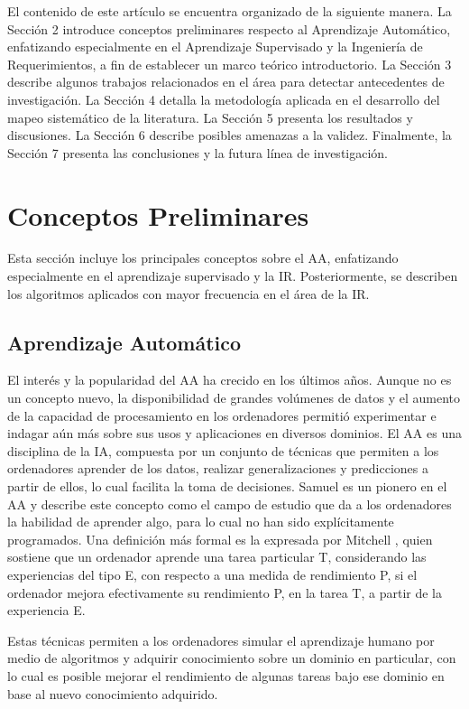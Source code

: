 \documentclass[journal]{IEEEtran}
\begin{document}
El contenido de este artículo se encuentra organizado de la siguiente manera. La Sección 2 introduce conceptos preliminares respecto al Aprendizaje Automático, enfatizando especialmente en el Aprendizaje Supervisado y la Ingeniería de Requerimientos, a fin de establecer un marco teórico introductorio. La Sección 3 describe algunos trabajos relacionados en el área para detectar antecedentes de investigación. La Sección 4 detalla la metodología aplicada en el desarrollo del mapeo sistemático de la literatura. La Sección 5 presenta los resultados y discusiones. La Sección 6 describe posibles amenazas a la validez. Finalmente, la Sección 7 presenta las conclusiones y la futura línea de investigación.  

\section{Conceptos Preliminares}

Esta sección incluye los principales conceptos sobre el AA, enfatizando especialmente en el aprendizaje supervisado y la IR. Posteriormente, se describen los algoritmos aplicados con mayor frecuencia en el área de la IR.

\subsection{Aprendizaje Automático}

El interés y la popularidad del AA ha crecido en los últimos años. Aunque no es un concepto nuevo, la disponibilidad de grandes volúmenes de datos y el aumento de la capacidad de procesamiento en los ordenadores permitió experimentar e indagar aún más sobre sus usos y aplicaciones en diversos dominios.
El AA es una disciplina de la IA, compuesta por un conjunto de técnicas que permiten a los ordenadores aprender de los datos, realizar generalizaciones y predicciones a partir de ellos, lo cual facilita la toma de decisiones. Samuel \cite{samuel1959some} es un pionero en el AA y describe este concepto como el campo de estudio que da a los ordenadores la habilidad de aprender algo, para lo cual no han sido explícitamente programados. Una definición más formal es la expresada por Mitchell \cite{mitchell1997machine}, quien sostiene que un ordenador aprende una tarea particular T, considerando las experiencias del tipo E, con respecto a una medida de rendimiento P, si el ordenador mejora efectivamente su rendimiento P, en la tarea T, a partir de la experiencia E.

Estas técnicas permiten a los ordenadores simular el aprendizaje humano por medio de algoritmos y adquirir conocimiento sobre un dominio en particular, con lo cual es posible mejorar el rendimiento de algunas tareas bajo ese dominio en base al nuevo conocimiento adquirido.
\end{document}
